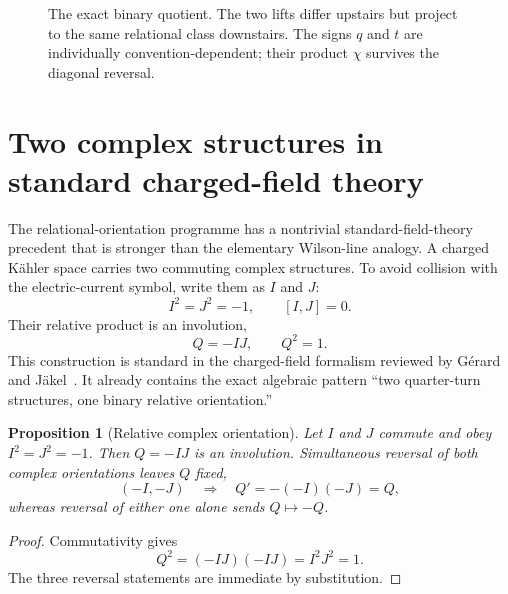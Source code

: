 \documentclass[11pt]{article}
\newtheorem{proposition}[theorem]{Proposition}
\theoremstyle{definition}\newtheorem{definition}[theorem]{Definition}
\theoremstyle{remark}\newtheorem{remark}[theorem]{Remark}\newtheorem{conjecture}[theorem]{Conjecture}
\begin{document}
\begin{figure}[t]
\centering
{}
\caption{The exact binary quotient. The two lifts differ upstairs but project to the same relational class downstairs. The signs $q$ and $t$ are individually convention-dependent; their product $\chi$ survives the diagonal reversal.}
\label{fig:quotient}
\end{figure}

\section{Two complex structures in standard charged-field theory}\label{sec:chargedkahler}
The relational-orientation programme has a nontrivial standard-field-theory precedent that is stronger than the elementary Wilson-line analogy. A charged K\"ahler space carries two commuting complex structures. To avoid collision with the electric-current symbol, write them as $I$ and $J$:
\begin{equation}
 I^2=J^2=-1,\qquad [I,J]=0.
\end{equation}
Their relative product is an involution,
\begin{equation}\label{eq:chargedKahlerQ}
 \boxed{Q=-IJ},\qquad Q^2=1.
\end{equation}
This construction is standard in the charged-field formalism reviewed by G\'erard and J\"akel~\cite{GerardJaekel2005}. It already contains the exact algebraic pattern ``two quarter-turn structures, one binary relative orientation.''

\begin{proposition}[Relative complex orientation]\label{prop:relativecomplex}
Let $I$ and $J$ commute and obey $I^2=J^2=-1$. Then $Q=-IJ$ is an involution. Simultaneous reversal of both complex orientations leaves $Q$ fixed,
\begin{equation}
 (-I,-J)\quad\Longrightarrow\quad Q'=-(-I)(-J)=Q,
\end{equation}
whereas reversal of either one alone sends $Q\mapsto-Q$.
\end{proposition}
\begin{proof}
Commutativity gives
\begin{equation}
 Q^2=(-IJ)(-IJ)=I^2J^2=1.
\end{equation}
The three reversal statements are immediate by substitution.
\end{proof}
\end{document}
